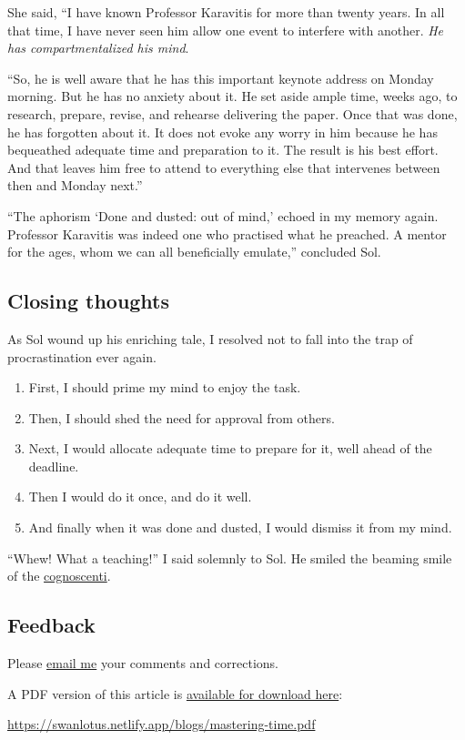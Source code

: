 \documentclass[
  a4paper,
]{article}
\providecommand{\tightlist}{%
  \setlength{\itemsep}{0pt}\setlength{\parskip}{0pt}}
\begin{document}
She said, ``I have known Professor Karavitis for more than twenty years.
In all that time, I have never seen him allow one event to interfere
with another. \emph{He has compartmentalized his mind}.

``So, he is well aware that he has this important keynote address on
Monday morning. But he has no anxiety about it. He set aside ample time,
weeks ago, to research, prepare, revise, and rehearse delivering the
paper. Once that was done, he has forgotten about it. It does not evoke
any worry in him because he has bequeathed adequate time and preparation
to it. The result is his best effort. And that leaves him free to attend
to everything else that intervenes between then and Monday next.''

``The aphorism `Done and dusted: out of mind,' echoed in my memory
again. Professor Karavitis was indeed one who practised what he
preached. A mentor for the ages, whom we can all beneficially emulate,''
concluded Sol.

\hypertarget{closing-thoughts}{%
\subsection{Closing thoughts}\label{closing-thoughts}}

As Sol wound up his enriching tale, I resolved not to fall into the trap
of procrastination ever again.

\begin{enumerate}
\tightlist
\item
  First, I should prime my mind to enjoy the task.
\item
  Then, I should shed the need for approval from others.
\item
  Next, I would allocate adequate time to prepare for it, well ahead of
  the deadline.
\item
  Then I would do it once, and do it well.
\item
  And finally when it was done and dusted, I would dismiss it from my
  mind.
\end{enumerate}

``Whew! What a teaching!'' I said solemnly to Sol. He smiled the beaming
smile of the
\href{https://www.dictionary.com/browse/cognoscenti}{cognoscenti}.

\hypertarget{feedback}{%
\subsection{Feedback}\label{feedback}}

Please \href{mailto:feedback.swanlotus@gmail.com}{email me} your
comments and corrections.

\noindent A PDF version of this article is
\href{./mastering-time.pdf}{available for download here}:

\begin{small}

\begin{sffamily}

\url{https://swanlotus.netlify.app/blogs/mastering-time.pdf}

\end{sffamily}

\end{small}
\end{document}
